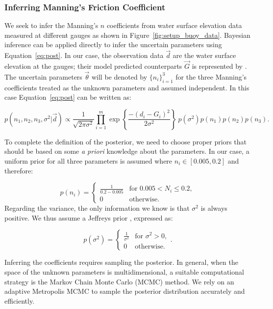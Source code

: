 \subsubsection{Inferring Manning's Friction Coefficient}
\label{sec:infmanning}
 
We seek to infer the Manning's $n$ coefficients from water surface elevation
data measured at different gauges as shown in Figure~\ref{fig:setup_buoy_data}.
Bayesian inference can be applied directly to infer the uncertain parameters
using Equation~\eqref{eq:post}. In our case, the observation data $\vec d$ 
are the water surface elevation at the gauges;
their model predicted counterparts $\vec G$ is represented by \geoclaw.
The uncertain parameters $\vec \theta$ will be denoted by $\{n_i\}_{i=1}^3$ for the
three Manning's coefficients treated as the unknown parameters and assumed independent. 
In this case  Equation~\eqref{eq:post} can be written as:

\begin{equation} 
p(n_1,n_2,n_3,\sigma^2 | \vec d) 
\propto \frac{1}{\sqrt{2 \pi \sigma^2}} 
 \prod_{i=1}^m  
\exp \left\lbrace \frac{-(d_i - G_i)^2}{2 \sigma^2} \right\rbrace
\ p(\sigma^2)p(n_1)p(n_2) p(n_3).
\label{eq:post_coef}
\end{equation}

To complete the definition of the posterior, we need to choose proper priors that should be based 
on some \emph{a priori} knowledge about the parameters. In our case, a uniform
prior for all three parameters is assumed where $n_i \in [0.005,0.2]$ and therefore:

\begin{equation} 
p(n_i) = \begin{cases}
		\displaystyle \frac{1}{0.2-0.005} &\text{for~} 0.005 <  N_i \leq 0.2 ,  \\
		0 &\text{otherwise}.
\end{cases}
\end{equation}
Regarding the variance, the only information we know 
is that $\sigma^2$ is always positive.
We thus assume a Jeffreys prior \citep{sivia}, expressed as:

\begin{equation} 
p(\sigma^2) =  \begin{cases}
		\displaystyle \frac{1}{\sigma^2} &\text{for~} \sigma^2 > 0,  \\
		0 &\text{otherwise}. 
		\end{cases}.
\label{eq:var_pr}
\end{equation}

Inferring the coefficients requires 
sampling the posterior. In general, when the space of the unknown 
parameters is multidimensional, a suitable computational strategy is 
the Markov Chain Monte  Carlo (MCMC) method. 
We rely on an adaptive Metropolis MCMC \citep{Gareth2009,Haario2001} to
sample the posterior distribution accurately and efficiently.


